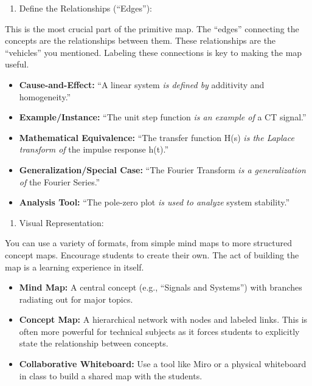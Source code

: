 \documentclass[
  letterpaper,
  DIV=11,
  numbers=noendperiod]{scrreprt}
\providecommand{\tightlist}{%
  \setlength{\itemsep}{0pt}\setlength{\parskip}{0pt}}\usepackage{longtable,booktabs,array}
\begin{document}
\begin{enumerate}
\def\labelenumi{\arabic{enumi}.}
\setcounter{enumi}{1}
\tightlist
\item
  Define the Relationships (``Edges''):
\end{enumerate}

This is the most crucial part of the primitive map. The ``edges''
connecting the concepts are the relationships between them. These
relationships are the ``vehicles'' you mentioned. Labeling these
connections is key to making the map useful.

\begin{itemize}
\item
  \textbf{Cause-and-Effect:} ``A linear system \emph{is defined by}
  additivity and homogeneity.''
\item
  \textbf{Example/Instance:} ``The unit step function \emph{is an
  example of} a CT signal.''
\item
  \textbf{Mathematical Equivalence:} ``The transfer function H(s)
  \emph{is the Laplace transform of} the impulse response h(t).''
\item
  \textbf{Generalization/Special Case:} ``The Fourier Transform \emph{is
  a generalization of} the Fourier Series.''
\item
  \textbf{Analysis Tool:} ``The pole-zero plot \emph{is used to analyze}
  system stability.''
\end{itemize}

\begin{enumerate}
\def\labelenumi{\arabic{enumi}.}
\setcounter{enumi}{2}
\tightlist
\item
  Visual Representation:
\end{enumerate}

You can use a variety of formats, from simple mind maps to more
structured concept maps. Encourage students to create their own. The act
of building the map is a learning experience in itself.

\begin{itemize}
\item
  \textbf{Mind Map:} A central concept (e.g., ``Signals and Systems'')
  with branches radiating out for major topics.
\item
  \textbf{Concept Map:} A hierarchical network with nodes and labeled
  links. This is often more powerful for technical subjects as it forces
  students to explicitly state the relationship between concepts.
\item
  \textbf{Collaborative Whiteboard:} Use a tool like Miro or a physical
  whiteboard in class to build a shared map with the students.
\end{itemize}
\end{document}
